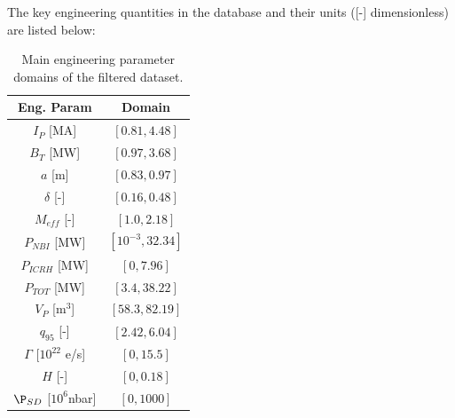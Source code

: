 \documentclass[a4paper, twoside, final, 12pt]{article}
\begin{document}
The key engineering quantities in the database and their units ([-] dimensionless) are listed below:

\begin{table}
\vspace{-10pt}
\centering
\caption{Main engineering parameter domains of the filtered dataset.}
\label{tab:main_domain}
\begin{tabular}{| c | c | }
	\hline
	Eng. Param & Domain \\
	\hline
	$I_P$ [MA] & $[0.81, 4.48]$ \\
	$B_T$ [MW] & $[0.97, 3.68]$ \\
	$a$ [m] & $[0.83, 0.97]$ \\
	$\delta$ [-] & $[0.16, 0.48]$ \\
	$M_{eff}$ [-] & $[1.0, 2.18]$ \\
	$P_{NBI}$ [MW] & $[10^{-3}, 32.34]$ \\
	$P_{ICRH}$ [MW] & $[0, 7.96]$ \\
	$P_{TOT}$ [MW] & $[3.4, 38.22]$ \\
	$V_P$ [m$^3$] &  $[58.3, 82.19]$ \\
	$q_{95}$ [-] & $[2.42, 6.04]$ \\
	$\Gamma$ [$10^{22}$ e/s] & $[0, 15.5]$ \\
	$H$ [-] & $[0, 0.18]$ \\
	$\P_{SD}$ [$10^6$nbar] & $[0,1000]$ \\
	\hline
\end{tabular}
\vspace{-8pt}
\end{table}
\end{document}
